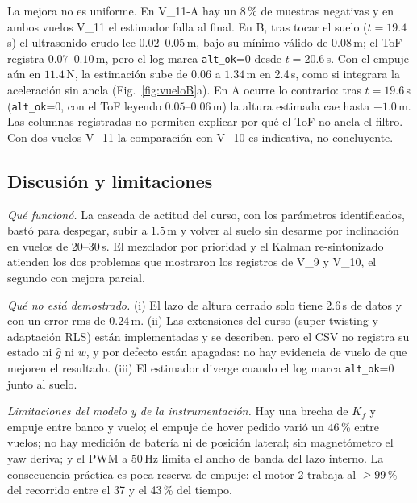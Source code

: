 La mejora no es uniforme. En V\_11-A hay un $8$\,\% de muestras negativas y en ambos vuelos V\_11 el estimador falla al final. En B, tras tocar el suelo ($t=19.4$\,s) el ultrasonido crudo lee $0.02$--$0.05$\,m, bajo su mínimo válido de $0.08$\,m; el ToF registra $0.07$--$0.10$\,m, pero el log marca \texttt{alt\_ok}=0 desde $t=20.6$\,s. Con el empuje aún en $11.4$\,N, la estimación sube de $0.06$ a $1.34$\,m en 2.4\,s, como si integrara la aceleración sin ancla (Fig.~\ref{fig:vueloB}a). En A ocurre lo contrario: tras $t=19.6$\,s (\texttt{alt\_ok}=0, con el ToF leyendo $0.05$--$0.06$\,m) la altura estimada cae hasta $-1.0$\,m. Las columnas registradas no permiten explicar por qué el ToF no ancla el filtro. Con dos vuelos V\_11 la comparación con V\_10 es indicativa, no concluyente.

\subsection{Discusión y limitaciones}
\label{sec:disc}
\emph{Qué funcionó.} La cascada de actitud del curso, con los parámetros identificados, bastó para despegar, subir a $1.5$\,m y volver al suelo sin desarme por inclinación en vuelos de 20--30\,s. El mezclador por prioridad y el Kalman re-sintonizado atienden los dos problemas que mostraron los registros de V\_9 y V\_10, el segundo con mejora parcial.

\emph{Qué no está demostrado.} (i) El lazo de altura cerrado solo tiene 2.6\,s de datos y con un error rms de $0.24$\,m. (ii) Las extensiones del curso (super-twisting y adaptación RLS) están implementadas y se describen, pero el CSV no registra su estado ni $\hat g$ ni $w$, y por defecto están apagadas: no hay evidencia de vuelo de que mejoren el resultado. (iii) El estimador diverge cuando el log marca \texttt{alt\_ok}=0 junto al suelo.

\emph{Limitaciones del modelo y de la instrumentación.} Hay una brecha de $K_f$ y empuje entre banco y vuelo; el empuje de hover pedido varió un $46$\,\% entre vuelos; no hay medición de batería ni de posición lateral; sin magnetómetro el yaw deriva; y el PWM a 50\,Hz limita el ancho de banda del lazo interno. La consecuencia práctica es poca reserva de empuje: el motor 2 trabaja al $\ge99$\,\% del recorrido entre el 37 y el 43\,\% del tiempo.

